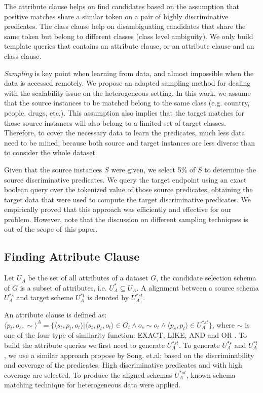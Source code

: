 The attribute clause helps on find candidates based on the assumption that positive matches share a similar token on a pair of highly discriminative predicates. The class clause help on disambiguating candidates that share the same token but belong to different classes (class level ambiguity).  We only build template queries that contains an attribute clause, or an attribute clause and an class clause. 


\emph{Sampling} is key point when learning from data, and almost impossible when the data is accessed remotely. We propose an adapted sampling method for dealing with the scalability issue on the heterogeneous setting. In this work, we assume that the source instances to be matched belong to the same class (e.g. country, people, drugs, etc.). This assumption also implies that the target matches for those source instances will also belong to a limited set of target classes. Therefore, to cover the necessary data to learn the predicates, much less data need to be mined, because both source and target instances are less diverse than to consider the whole dataset.

Given that the source instances $S$ were given, we select 5\% of $S$ to determine the source discriminative predicates. We query the target endpoint using an exact boolean query over the tokenized value of those source predicates; obtaining the target data that were used to compute the target discriminative predicates. We empirically proved that this approach was efficiently and effective for our problem. However, note that the discussion on different sampling techniques is out of the scope of this paper.

\subsection{Finding Attribute Clause}

Let $U_A$ be the set of all attributes of a dataset $G$, the candidate selection schema of $G$ is a subset of attributes, i.e. $U^*_A  \subseteq U_A$.  A alignment between a source schema $U^{*s}_A$ and target scheme $U^{*t}_A$ is denoted by $U^{*st}_A$.


An attribute clause is defined as: $\langle p_t,o_s,\sim \rangle^A=\{\langle s_t,p_t,o_t \rangle | \langle s_t,p_t,o_t \rangle \in G_t \land o_s\sim o_t \land \langle p_s, p_t \rangle \in U^{*st}_A\}$, where $\sim$ is one of the four type of similarity function: EXACT, LIKE, AND and  OR . To build the attribute queries we first need to generate $U^{*st}_A$. To generate $U^{*s}_A$ and $U^{*t}_A$, we use a similar approach propose by Song. et.al; based on the discriminability and coverage of the predicates. High discriminative predicates and with high coverage are selected. To produce the aligned schemas $U^{*st}_A$, known schema matching technique for heterogeneous data were applied.  

